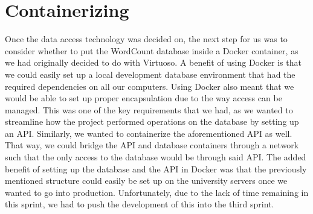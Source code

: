 \section{Containerizing}\label{sec:Containerizing}
Once the data access technology was decided on, the next step for us was to consider whether to put the WordCount database inside a Docker container, as we had originally decided to do with Virtuoso. A benefit of using Docker is that we could easily set up a local development database environment that had the required dependencies on all our computers. Using Docker also meant that we would be able to set up proper encapsulation due to the way access can be managed. This was one of the key requirements that we had, as we wanted to streamline how the \knox{} project performed operations on the database by setting up an API. 
Similarly, we wanted to containerize the aforementioned API as well. That way, we could bridge the API and database containers through a network such that the only access to the database would be through said API.
The added benefit of setting up the database and the API in Docker was that the previously mentioned structure could easily be set up on the university servers once we wanted to go into production.
Unfortunately, due to the lack of time remaining in this sprint, we had to push the development of this into the third sprint.